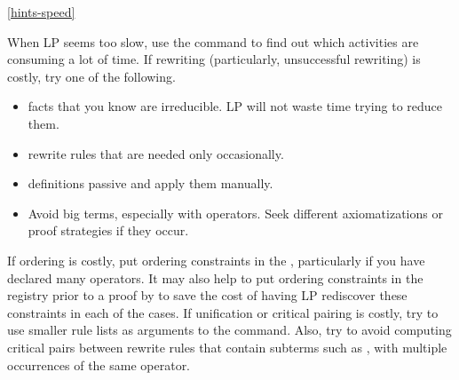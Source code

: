 \ref{hints-speed}

When LP seems too slow, use the  command to find out which
activities are consuming a lot of time.  If rewriting (particularly,
unsuccessful rewriting) is costly, try one of the following.
\begin{itemize}
\item
{} facts that you know are irreducible.  
LP will not waste time trying to reduce them.
\item
{} rewrite rules that are needed only 
occasionally.
\item
{} definitions passive and apply them manually.
\item
Avoid big terms, especially with
 operators.  Seek different
axiomatizations or proof strategies if they occur.
\end{itemize}

If ordering is costly, put ordering constraints in the
, particularly if you have declared many 
operators.  It may also help to put ordering constraints in the registry prior
to a proof by  to save the cost of having LP rediscover
these constraints in each of the cases.
\p
If unification or critical pairing is costly, try to use smaller rule lists as
arguments to the  command.  Also, try to avoid computing
critical pairs between rewrite rules that contain subterms such as 
, with multiple occurrences of the
same  operator.


